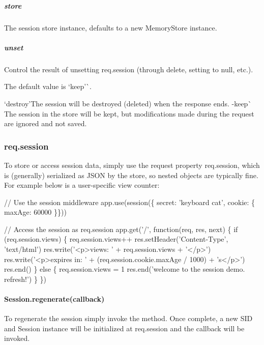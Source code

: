 \subparagraph*{store}

The session store instance, defaults to a new {\ttfamily Memory\+Store} instance.

\subparagraph*{unset}

Control the result of unsetting {\ttfamily req.\+session} (through {\ttfamily delete}, setting to {\ttfamily null}, etc.).

The default value is `\textquotesingle{}keep'\`{}.


\begin{DoxyItemize}
\item `\textquotesingle{}destroy'{\ttfamily The session will be destroyed (deleted) when the response ends. -\/}\textquotesingle{}keep\textquotesingle{}\`{} The session in the store will be kept, but modifications made during the request are ignored and not saved.
\end{DoxyItemize}

\subsubsection*{req.\+session}

To store or access session data, simply use the request property {\ttfamily req.\+session}, which is (generally) serialized as J\+S\+ON by the store, so nested objects are typically fine. For example below is a user-\/specific view counter\+:


\begin{DoxyCode}
// Use the session middleware
app.use(session(\{ secret: 'keyboard cat', cookie: \{ maxAge: 60000 \}\}))

// Access the session as req.session
app.get('/', function(req, res, next) \{
  if (req.session.views) \{
    req.session.views++
    res.setHeader('Content-Type', 'text/html')
    res.write('<p>views: ' + req.session.views + '</p>')
    res.write('<p>expires in: ' + (req.session.cookie.maxAge / 1000) + 's</p>')
    res.end()
  \} else \{
    req.session.views = 1
    res.end('welcome to the session demo. refresh!')
  \}
\})
\end{DoxyCode}


\paragraph*{Session.\+regenerate(callback)}

To regenerate the session simply invoke the method. Once complete, a new S\+ID and {\ttfamily Session} instance will be initialized at {\ttfamily req.\+session} and the {\ttfamily callback} will be invoked.


